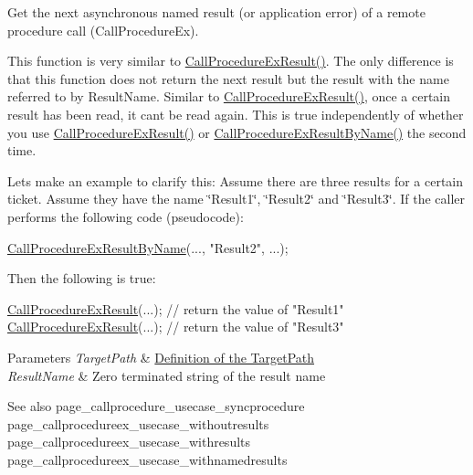 Get the next asynchronous named result (or application error) of a remote procedure call (Call\+Procedure\+Ex). 

This function is very similar to \hyperlink{group__commonfunctions_ga293b3f14ba486519c29ac9abfd0471e3}{Call\+Procedure\+Ex\+Result()}. The only difference is that this function does not return the \textquotesingle{}next result\textquotesingle{} but the result with the name referred to by Result\+Name. Similar to \hyperlink{group__commonfunctions_ga293b3f14ba486519c29ac9abfd0471e3}{Call\+Procedure\+Ex\+Result()}, once a certain result has been read, it can\textquotesingle{}t be read again. This is true independently of whether you use \hyperlink{group__commonfunctions_ga293b3f14ba486519c29ac9abfd0471e3}{Call\+Procedure\+Ex\+Result()} or \hyperlink{group__commonfunctions_ga569a93aeed06c2745365c881be5e7828}{Call\+Procedure\+Ex\+Result\+By\+Name()} the second time.

Lets make an example to clarify this\+: Assume there are three results for a certain ticket. Assume they have the name \char`\"{}\+Result1\char`\"{}, \char`\"{}\+Result2\char`\"{} and \char`\"{}\+Result3\char`\"{}. If the caller performs the following code (pseudocode)\+: 
\begin{DoxyCode}
\hyperlink{group__commonfunctions_ga569a93aeed06c2745365c881be5e7828}{CallProcedureExResultByName}(..., \textcolor{stringliteral}{"Result2"}, ...);
\end{DoxyCode}
 Then the following is true\+: 
\begin{DoxyCode}
\hyperlink{group__commonfunctions_ga293b3f14ba486519c29ac9abfd0471e3}{CallProcedureExResult}(...); \textcolor{comment}{// return the value of "Result1"}
\hyperlink{group__commonfunctions_ga293b3f14ba486519c29ac9abfd0471e3}{CallProcedureExResult}(...); \textcolor{comment}{// return the value of "Result3"}
\end{DoxyCode}



\begin{DoxyParams}{Parameters}
{\em Target\+Path} & \hyperlink{incodefinitions_targetpath}{Definition of the Target\+Path} \\
\hline
{\em Result\+Name} & Zero terminated string of the result name\\
\hline
\end{DoxyParams}
\begin{DoxySeeAlso}{See also}
page\+\_\+callprocedure\+\_\+usecase\+\_\+syncprocedure~\newline
 page\+\_\+callprocedureex\+\_\+usecase\+\_\+withoutresults~\newline
 page\+\_\+callprocedureex\+\_\+usecase\+\_\+withresults~\newline
 page\+\_\+callprocedureex\+\_\+usecase\+\_\+withnamedresults 
\end{DoxySeeAlso}
\mbox{\label{group__commonfunctions_ga7ea052077eebe514aa0cb1756c595189}} 
